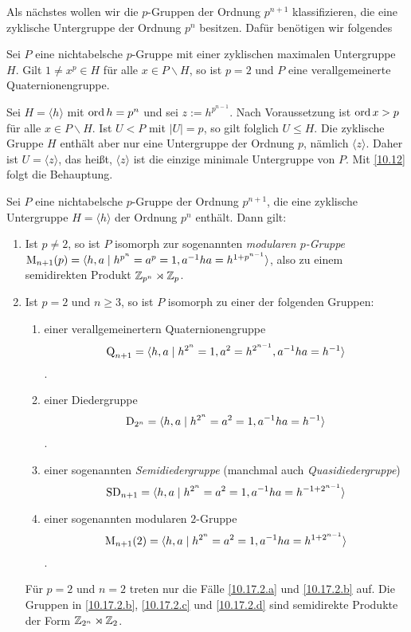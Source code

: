 Als n\"achstes wollen wir die $p$-Gruppen der Ordnung $p^{n+1}$ klassifizieren, die eine zyklische Untergruppe der Ordnung $p^n$ besitzen. Daf\"ur ben\"otigen wir folgendes

\begin{lemma}
 Sei $P$ eine nichtabelsche $p$-Gruppe mit einer zyklischen maximalen Untergruppe $H$. Gilt $1\neq x^p\in H$ f\"ur alle $x\in P\backslash H$, so ist $p=2$ und $P$ eine verallgemeinerte Quaternionengruppe.
\end{lemma}

\begin{beweis}
Sei $H=\langle h\rangle$ mit $\operatorname{ord} h=p^n$ und sei $z:=h^{p^{n-1}}$. Nach Voraussetzung ist $\operatorname{ord} x>p$ f\"ur alle $x\in P\backslash H$. Ist $U<P$ mit $|U|=p$, so gilt folglich $U\leq H$. Die zyklische Gruppe $H$ enth\"alt aber nur eine Untergruppe der Ordnung $p$, n\"amlich $\langle z\rangle$. Daher ist $U=\langle z\rangle$, das hei\ss{}t, $\langle z\rangle$ ist die einzige minimale Untergruppe von $P$. Mit \ref{10.12} folgt die Behauptung.
 \end{beweis}

\begin{satz}\label{10.17}
 Sei $P$ eine nichtabelsche $p$-Gruppe der Ordnung $p^{n+1}$, die eine zyklische Untergruppe $H=\langle h\rangle$ der Ordnung $p^n$ enth\"alt. Dann gilt:
\begin{enumerate}
 \item \label{10.17.1}Ist $p\neq 2$, so ist $P$ isomorph zur sogenannten \emph{modularen $p$-Gruppe} $\operatorname{M}_{n+1}(p)=\langle h, a\mid h^{p^n}=a^p=1, a^{-1}ha=h^{1+p^{n-1}}\rangle$, also zu einem semidirekten Produkt $\mathbb{Z}_{p^n}\rtimes\mathbb{Z}_p$.
 \item Ist $p=2$ und $n\geq 3$, so ist $P$ isomorph zu einer der folgenden Gruppen:
  \begin{enumerate}
   \item \label{10.17.2.a}einer verallgemeinertern Quaternionengruppe $$\operatorname{Q}_{n+1}=\langle h, a\mid h^{2^n}=1, a^2=h^{2^{n-1}}, a^{-1}ha=h^{-1}\rangle$$.
   \item \label{10.17.2.b}einer Diedergruppe $$\operatorname{D}_{2^n}=\langle h,a\mid h^{2^n}=a^2=1, a^{-1}ha=h^{-1}\rangle$$.
   \item \label{10.17.2.c}einer sogenannten \emph{Semidiedergruppe} (manchmal auch \emph{Quasidiedergruppe}) $$\operatorname{SD}_{n+1}=\langle h,a\mid h^{2^n}=a^2=1, a^{-1}ha=h^{-1+2^{n-1}}\rangle$$
   \item\label{10.17.2.d} einer sogenannten modularen $2$-Gruppe $$\operatorname{M}_{n+1}(2)=\langle h, a\mid h^{2^n}=a^2=1, a^{-1}ha=h^{1+2^{n-1}}\rangle$$.
   \end{enumerate}
   F\"ur $p=2$ und $n=2$ treten nur die F\"alle \ref{10.17.2.a} und \ref{10.17.2.b} auf. Die Gruppen in \ref{10.17.2.b}, \ref{10.17.2.c} und \ref{10.17.2.d} sind semidirekte Produkte der Form $\mathbb{Z}_{2^n}\rtimes \mathbb{Z}_2$.
\end{enumerate}

\end{satz}

